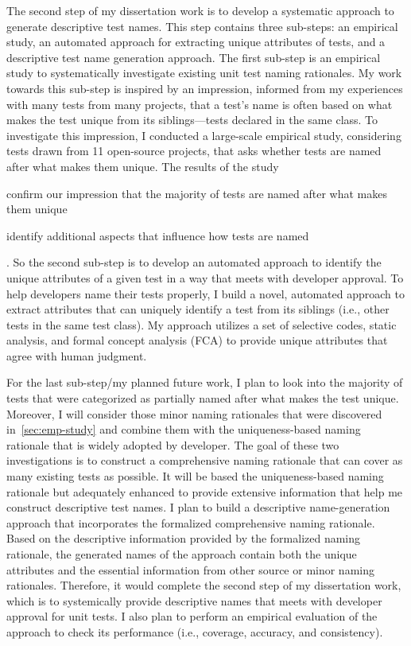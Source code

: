 The second step of my dissertation work is to develop a systematic approach to generate descriptive test names.
%
This step contains three sub-steps: an empirical study, an automated approach for extracting unique attributes of tests, and a descriptive test name generation approach.
%
The first sub-step is an empirical study to systematically investigate existing unit test naming rationales.
%
My work towards this sub-step is inspired by an impression, informed from my experiences with many tests from many projects, that a test's name is often based on what makes the test unique from its siblings---tests declared in the same class.
%
To investigate this impression, I conducted a large-scale empirical study, considering tests drawn from \num{11} open-source projects, that asks whether tests are named after what makes them unique.
%
The results of the study
\begin{enumerate*}
\item confirm our impression that the majority of tests are named after what makes them unique
\item identify additional aspects that influence how tests are named
\end{enumerate*}.
%
So the second sub-step is to develop an automated approach to identify the unique attributes of a given test in a way that meets with developer approval.
%
To help developers name their tests properly, I build a novel, automated approach to extract attributes that can uniquely identify a test from its siblings (i.e., other tests in the same test class).
% 
My approach utilizes a set of selective codes, static analysis, and formal concept analysis (FCA) to provide unique attributes that agree with human judgment.


For the last sub-step\slash my planned future work, I plan to look into the majority of tests that were categorized as partially named after what makes the test unique.
%
Moreover, I will consider those minor naming rationales that were discovered in~\cref{sec:emp-study} and combine them with the uniqueness-based naming rationale that is widely adopted by developer.
%
The goal of these two investigations is to construct a comprehensive naming rationale that can cover as many existing tests as possible.
%
It will be based the uniqueness-based naming rationale but adequately enhanced to provide extensive information that help me construct descriptive test names.
%
I plan to build a descriptive name-generation approach that incorporates the formalized comprehensive naming rationale.
%
Based on the descriptive information provided by the formalized naming rationale, the generated names of the approach contain both the unique attributes and the essential information from other source or minor naming rationales.
%
Therefore, it would complete the second step of my dissertation work, which is to systemically provide descriptive names that meets with developer approval for unit tests.
%
I also plan to perform an empirical evaluation of the approach to check its performance (i.e., coverage, accuracy, and consistency).
